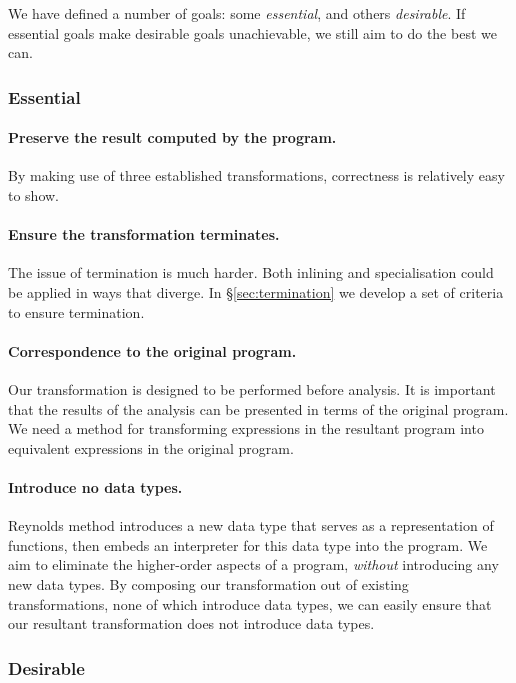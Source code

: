 \documentclass[preprint]{sigplanconf}
\begin{document}
We have defined a number of goals: some \textit{essential}, and others \textit{desirable}. If essential goals make desirable goals unachievable, we still aim to do the best we can.

\subsubsection*{Essential}

\paragraph{Preserve the result computed by the program.} By making use of three established transformations, correctness is relatively easy to show.

\paragraph{Ensure the transformation terminates.} The issue of termination is much harder. Both inlining and specialisation could be applied in ways that diverge. In \S\ref{sec:termination} we develop a set of criteria to ensure termination.

\paragraph{Correspondence to the original program.} Our transformation is designed to be performed before analysis. It is important that the results of the analysis can be presented in terms of the original program. We need a method for transforming expressions in the resultant program into equivalent expressions in the original program.

\paragraph{Introduce no data types.} Reynolds method introduces a new data type that serves as a representation of functions, then embeds an interpreter for this data type into the program. We aim to eliminate the higher-order aspects of a program, \textit{without} introducing any new data types. By composing our transformation out of existing transformations, none of which introduce data types, we can easily ensure that our resultant transformation does not introduce data types.


\subsubsection*{Desirable}
\end{document}
